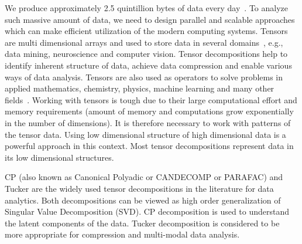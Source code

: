 \documentclass[a4paper,11pt]{article}
\newcommand{\bora}[1]{{\color{magenta} \emph{#1}}}
\renewcommand{\bora}[1]{}
\newcommand{\sk}[1]{{\color{blue} \emph{#1}}}
\renewcommand{\sk}[1]{}
\newcommand{\todo}[1]{{\color{red}\rule[-.1cm]{.4cm}{.4cm}~~{
			\color{red}{TODO: #1}}}\xspace}
\begin{document}
	
	
	We produce approximately 2.5 quintillion bytes of data every day~\cite{data-size}. To analyze such massive amount of data, we need to design parallel and scalable approaches which can make efficient utilization of the modern computing systems. Tensors are multi dimensional arrays and used to store data in several domains~\cite{KB-SIAM-2009}, e.g., data mining, neuroscience and computer vision. Tensor decompositions help to identify inherent structure of data, achieve data compression and enable various ways of data analysis. Tensors are also used as operators to solve problems in applied mathematics, chemistry, physics, machine learning and many other fields~\cite{KB-SIAM-2009,NPOV-NIPS-2015}. Working with tensors is tough due to their large computational effort and memory requirements (amount of memory and computations grow exponentially in the number of dimensions). It is therefore necessary to work with patterns of the tensor data. Using low dimensional structure of high dimensional data is a powerful approach in this context. Most tensor decompositions represent data in its low dimensional structures.
	\bora{the last three statements need some tidying up.}
	\sk{I tried to do minor rephrase.}	
	
	

	
	
	


	CP (also known as Canonical Polyadic or CANDECOMP or PARAFAC) and Tucker are the widely used tensor decompositions in the literature for data analytics. Both decompositions can be viewed as high order generalization of Singular Value Decomposition (SVD). CP decomposition is used to understand the latent components of the data. Tucker decomposition is considered to be more appropriate for compression and multi-modal data analysis.
	
\end{document}
